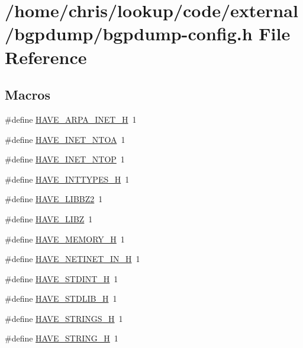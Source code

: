 \hypertarget{bgpdump-config_8h}{\section{/home/chris/lookup/code/external/bgpdump/bgpdump-\/config.h File Reference}
\label{bgpdump-config_8h}
}
\subsection*{Macros}
\begin{DoxyCompactItemize}
\item 
\#define \hyperlink{bgpdump-config_8h_a7d1a71461e07569d0c9003da24c30a59}{H\-A\-V\-E\-\_\-\-A\-R\-P\-A\-\_\-\-I\-N\-E\-T\-\_\-\-H}~1
\item 
\#define \hyperlink{bgpdump-config_8h_a361f0c6ade86d6747903bfb371146694}{H\-A\-V\-E\-\_\-\-I\-N\-E\-T\-\_\-\-N\-T\-O\-A}~1
\item 
\#define \hyperlink{bgpdump-config_8h_a8a52d737cad66d9e7461010dbd91cac5}{H\-A\-V\-E\-\_\-\-I\-N\-E\-T\-\_\-\-N\-T\-O\-P}~1
\item 
\#define \hyperlink{bgpdump-config_8h_ab90a030ff2790ebdc176660a6dd2a478}{H\-A\-V\-E\-\_\-\-I\-N\-T\-T\-Y\-P\-E\-S\-\_\-\-H}~1
\item 
\#define \hyperlink{bgpdump-config_8h_ad6410713c35d492bb8aa472391679bbd}{H\-A\-V\-E\-\_\-\-L\-I\-B\-B\-Z2}~1
\item 
\#define \hyperlink{bgpdump-config_8h_ab52774670674c949e48837976b331e33}{H\-A\-V\-E\-\_\-\-L\-I\-B\-Z}~1
\item 
\#define \hyperlink{bgpdump-config_8h_ae93a78f9d076138897af441c9f86f285}{H\-A\-V\-E\-\_\-\-M\-E\-M\-O\-R\-Y\-\_\-\-H}~1
\item 
\#define \hyperlink{bgpdump-config_8h_a0938658b988a082864efcee2d1b2bfd2}{H\-A\-V\-E\-\_\-\-N\-E\-T\-I\-N\-E\-T\-\_\-\-I\-N\-\_\-\-H}~1
\item 
\#define \hyperlink{bgpdump-config_8h_ab6cd6d1c63c1e26ea2d4537b77148354}{H\-A\-V\-E\-\_\-\-S\-T\-D\-I\-N\-T\-\_\-\-H}~1
\item 
\#define \hyperlink{bgpdump-config_8h_a9e0e434ec1a6ddbd97db12b5a32905e0}{H\-A\-V\-E\-\_\-\-S\-T\-D\-L\-I\-B\-\_\-\-H}~1
\item 
\#define \hyperlink{bgpdump-config_8h_a405d10d46190bcb0320524c54eafc850}{H\-A\-V\-E\-\_\-\-S\-T\-R\-I\-N\-G\-S\-\_\-\-H}~1
\item 
\#define \hyperlink{bgpdump-config_8h_ad4c234dd1625255dc626a15886306e7d}{H\-A\-V\-E\-\_\-\-S\-T\-R\-I\-N\-G\-\_\-\-H}~1

\end{DoxyCompactItemize}
